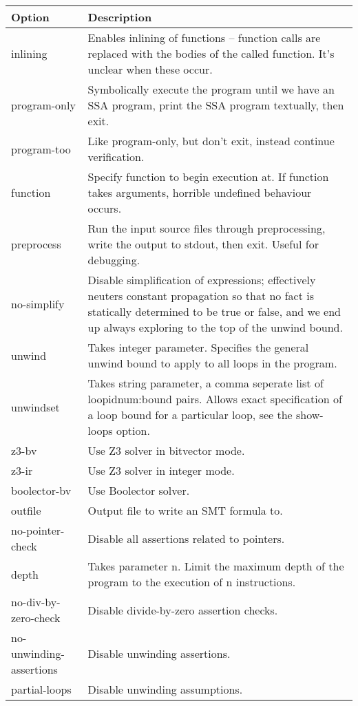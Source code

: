 \documentclass{article}
\begin{document}
\begin{table*}[ht]
\centering
\begin{tabularx}{\linewidth}{|l|X|}
\hline
Option & Description\\
\hline
inlining & Enables inlining of functions -- function calls are replaced with the
bodies of the called function. It's unclear when these occur.\\
\hline
program-only & Symbolically execute the program until we have an SSA program,
print the SSA program textually, then exit.\\
\hline
program-too & Like program-only, but don't exit, instead continue
verification.\\
\hline
function & Specify function to begin execution at. If function takes arguments,
horrible undefined behaviour occurs.\\
\hline
preprocess & Run the input source files through preprocessing, write the output
to stdout, then exit. Useful for debugging.\\
\hline
no-simplify & Disable simplification of expressions; effectively neuters
constant propagation so that no fact is statically determined to be true or
false, and we end up always exploring to the top of the unwind bound.\\
\hline
unwind & Takes integer parameter. Specifies the general unwind bound to apply
to all loops in the program.\\
\hline
unwindset & Takes string parameter, a comma seperate list of loopidnum:bound
pairs. Allows exact specification of a loop bound for a particular loop, see
the show-loops option.\\
\hline
z3-bv & Use Z3 solver in bitvector mode.\\
\hline
z3-ir & Use Z3 solver in integer mode.\\
\hline
boolector-bv & Use Boolector solver.\\
\hline
outfile & Output file to write an SMT formula to.\\
\hline
no-pointer-check & Disable all assertions related to pointers.\\
\hline
depth & Takes parameter n. Limit the maximum depth of the program to the
execution of n instructions.\\
\hline
no-div-by-zero-check & Disable divide-by-zero assertion checks.\\
\hline
no-unwinding-assertions & Disable unwinding assertions.\\
\hline
partial-loops & Disable unwinding assumptions.\\

\end{tabularx}
\end{table*}
\end{document}
